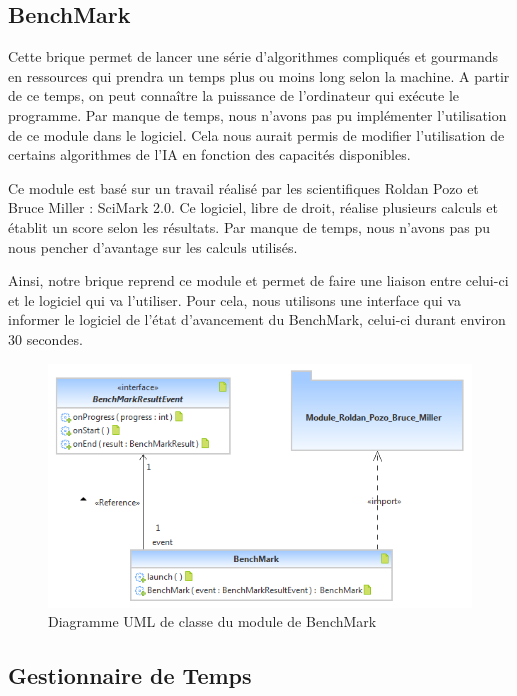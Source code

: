 \subsection{BenchMark}

Cette brique permet de lancer une série d'algorithmes compliqués et gourmands en ressources qui prendra un temps plus ou moins long selon la machine. A partir de ce temps, on peut connaître la puissance de l'ordinateur qui exécute le programme. Par manque de temps, nous n'avons pas pu implémenter l'utilisation de ce module dans le logiciel. Cela nous aurait permis de modifier l'utilisation de certains algorithmes de l'IA en fonction des capacités disponibles.

Ce module est basé sur un travail réalisé par les scientifiques Roldan Pozo et Bruce Miller : SciMark 2.0. Ce logiciel, libre de droit, réalise plusieurs calculs et établit un score selon les résultats. Par manque de temps, nous n'avons pas pu nous pencher d'avantage sur les calculs utilisés.

Ainsi, notre brique reprend ce module et permet de faire une liaison entre celui-ci et le logiciel qui va l'utiliser. Pour cela, nous utilisons une interface qui va informer le logiciel de l'état d'avancement du BenchMark, celui-ci durant environ 30 secondes.

\begin{figure}[H]
\centering
\includegraphics[scale=1]{Architecture/BenchMark.png}
\caption{Diagramme UML de classe du module de BenchMark}
\label{bench}
\end{figure}

\subsection{Gestionnaire de Temps}

